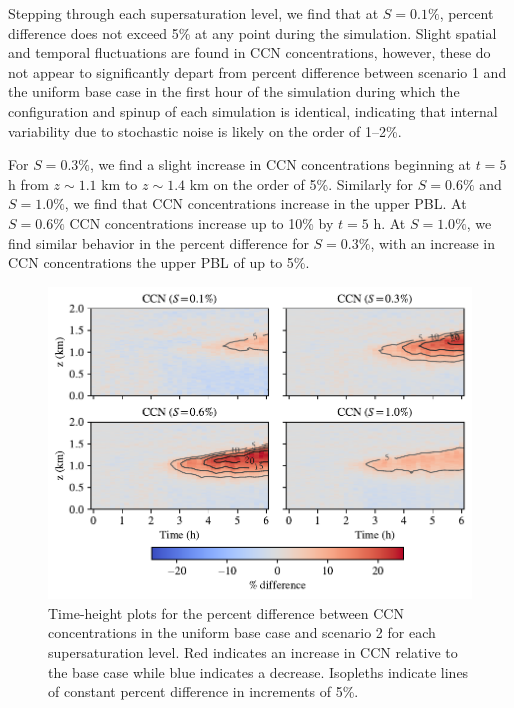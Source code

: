 Stepping through each supersaturation level, we find that at $S=0.1\%$, percent difference does not exceed 5\% at any point during the simulation. Slight spatial and temporal fluctuations are found in CCN concentrations, however, these do not appear to significantly depart from percent difference between scenario 1 and the uniform base case in the first hour of the simulation during which the configuration and spinup of each simulation is identical, indicating that internal variability due to stochastic noise is likely on the order of 1--2\%.

For $S=0.3\%$, we find a slight increase in CCN concentrations beginning at $t=5$ h from $z\sim1.1$ km to $z\sim1.4$ km on the order of 5\%. Similarly for $S=0.6\%$ and $S=1.0\%$, we find that CCN concentrations increase in the upper PBL. At $S=0.6\%$ CCN concentrations increase up to 10\% by $t=5$ h. At $S=1.0\%$, we find similar behavior in the percent difference for $S=0.3\%$, with an increase in CCN concentrations the upper PBL of up to 5\%.

\begin{figure}[!t]
  \centering
    \includegraphics[width=\textwidth]{figures/chapter5/height-time-ccn-pdiff-road-10x.pdf}
    \caption{Time-height plots for the percent difference between CCN concentrations in the uniform base case and scenario 2 for each supersaturation level. Red indicates an increase in CCN relative to the base case while blue indicates a decrease. Isopleths indicate lines of constant percent difference in increments of 5\%.}
    \label{fig:ht-ccn-pdiff-s2}
\end{figure}

